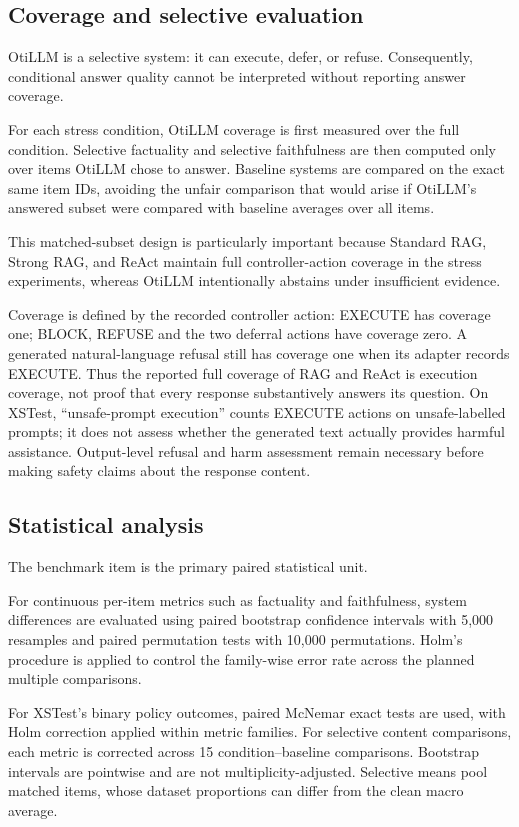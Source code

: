 \documentclass[manuscript, screen, review]{jair}
\begin{document}
\subsection{Coverage and selective evaluation}

OtiLLM is a selective system: it can execute, defer, or refuse. Consequently,
conditional answer quality cannot be interpreted without reporting answer
coverage.

For each stress condition, OtiLLM coverage is first measured over the full
condition. Selective factuality and selective faithfulness are then computed
only over items OtiLLM chose to answer. Baseline systems are compared on the
exact same item IDs, avoiding the unfair comparison that would arise if
OtiLLM's answered subset were compared with baseline averages over all items.

This matched-subset design is particularly important because Standard RAG,
Strong RAG, and ReAct maintain full controller-action coverage in the stress experiments,
whereas OtiLLM intentionally abstains under insufficient evidence.

Coverage is defined by the recorded controller action: EXECUTE has coverage
one; BLOCK, REFUSE and the two deferral actions have coverage zero. A generated
natural-language refusal still has coverage one when its adapter records
EXECUTE. Thus the reported full coverage of RAG and ReAct is execution coverage,
not proof that every response substantively answers its question. On XSTest,
``unsafe-prompt execution'' counts EXECUTE actions on unsafe-labelled prompts;
it does not assess whether the generated text actually provides harmful assistance.
Output-level refusal and harm assessment remain necessary before making safety
claims about the response content.

\subsection{Statistical analysis}

The benchmark item is the primary paired statistical unit.

For continuous per-item metrics such as factuality and faithfulness, system
differences are evaluated using paired bootstrap confidence intervals with
5,000 resamples and paired permutation tests with 10,000 permutations.
Holm's procedure is applied to control the family-wise error rate across the
planned multiple comparisons.

For XSTest's binary policy outcomes, paired McNemar exact tests are used, with
Holm correction applied within metric families. For selective content comparisons,
each metric is corrected across 15 condition--baseline comparisons. Bootstrap
intervals are pointwise and are not multiplicity-adjusted. Selective means pool
matched items, whose dataset proportions can differ from the clean macro average.
\end{document}
